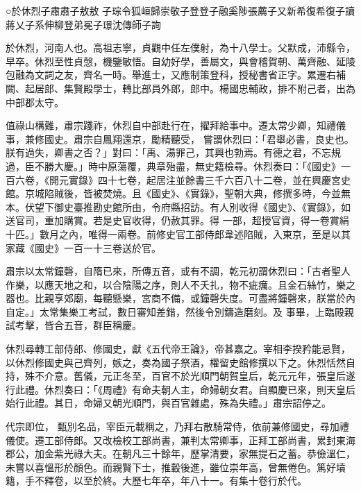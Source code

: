 
\begin{pinyinscope}

 ○於休烈子肅肅子敖敖
 子琮令狐峘歸崇敬子登登子融奚陟張薦子又新希復希復子讀蔣乂子系伸柳登弟冕子璟沈傳師子詢



 於休烈，河南人也。高祖志寧，貞觀中任左僕射，為十八學士。父默成，沛縣令，早卒。休烈至性貞愨，機鑒敏悟。自幼好學，善屬文，與會稽賀朝、萬齊融、延陵包融為文詞之友，齊名一時。舉進士，又應制策登科，授秘書省正字。累遷右補闕、起居郎、集賢殿學士，轉比部員外郎，郎中。楊國忠輔政，排不附己者，出為中部郡太守。



 值祿山構難，肅宗踐祚，休烈自中部赴行在，擢拜給事中。遷太常少卿，知禮儀事，兼修國史。肅宗自鳳翔還京，勵精聽受，
 嘗謂休烈曰：「君舉必書，良史也。朕有過失，卿書之否？」對曰：「禹、湯罪己，其興也勃焉。有德之君，不忘規過，臣不勝大慶。」時中原蕩覆，典章殆盡，無史籍檢尋。休烈奏曰：「《國史》一百六卷，《開元實錄》四十七卷，起居注並餘書三千六百八十二卷，並在興慶宮史館。京城陷賊後，皆被焚燒。且《國史》、《實錄》，聖朝大典，修撰多時，今並無本。伏望下御史臺推勘史館所由，令府縣招訪。有人別收得《國史》、《實錄》，如送官司，重加購賞。若是史官收得，仍赦其罪。得
 一部，超授官資，得一卷賞絹十匹。」數月之內，唯得一兩卷。前修史官工部侍郎韋述陷賊，入東京，至是以其家藏《國史》一百一十三卷送於官。



 肅宗以太常鐘磬，自隋已來，所傳五音，或有不調，乾元初謂休烈曰：「古者聖人作樂，以應天地之和，以合陰陽之序，則人不夭扎，物不疵癘。且金石絲竹，樂之器也。比親享郊廟，每聽懸樂，宮商不備，或鐘磬失度。可盡將鐘磬來，朕當於內自定。」太常集樂工考試，數日審知差錯，然後令別鑄造磨刻。及
 事畢，上臨殿親試考擊，皆合五音，群臣稱慶。



 休烈尋轉工部侍郎、修國史，獻《五代帝王論》，帝甚嘉之。宰相李揆矜能忌賢，以休烈修國史與己齊列，嫉之，奏為國子祭酒，權留史館修撰以下之。休烈恬然自持，殊不介意。舊儀，元正冬至，百官不於光順門朝賀皇后，乾元元年，張皇后遂行此禮。休烈奏曰：「《周禮》有命夫朝人主，命婦朝女君。自顯慶已來，則天皇后始行此禮。其日，命婦又朝光順門，與百官雜處，殊為失禮。」肅宗詔停之。



 代宗即位，
 甄別名品，宰臣元載稱之，乃拜右散騎常侍，依前兼修國史，尋加禮儀使。遷工部侍郎。又改檢校工部尚書，兼判太常卿事，正拜工部尚書，累封東海郡公，加金紫光祿大夫。在朝凡三十餘年，歷掌清要，家無提石之蓄。恭儉溫仁，未嘗以喜慍形於顏色。而親賢下士，推轂後進，雖位崇年高，曾無倦色。篤好墳籍，手不釋卷，以至於終。大歷七年卒，年八十一。有集十卷行於代。




\end{pinyinscope}
